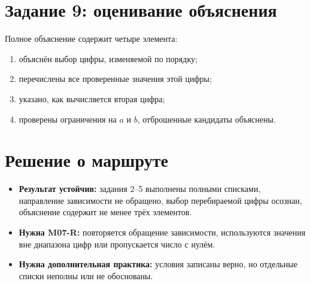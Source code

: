 \section{Задание 9: оценивание объяснения}

Полное объяснение содержит четыре элемента:
\begin{enumerate}
  \item объяснён выбор цифры, изменяемой по порядку;
  \item перечислены все проверенные значения этой цифры;
  \item указано, как вычисляется вторая цифра;
  \item проверены ограничения на \(a\) и \(b\), отброшенные кандидаты объяснены.
\end{enumerate}

\newpage
\section{Решение о маршруте}

\begin{resultbox}[Проверка]
  \begin{itemize}
    \item \textbf{Результат устойчив:} задания 2--5 выполнены полными
      списками, направление зависимости не обращено, выбор перебираемой цифры
      осознан, объяснение содержит не менее трёх элементов.
    \item \textbf{Нужна M07-R:} повторяется обращение зависимости,
      используются значения вне диапазона цифр или пропускается число с нулём.
    \item \textbf{Нужна дополнительная практика:} условия записаны верно, но
      отдельные списки неполны или не обоснованы.
  \end{itemize}
\end{resultbox}

